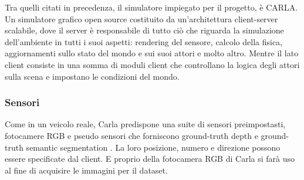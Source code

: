 \documentclass[14pt]{extarticle}
\begin{document}

Tra quelli citati in precedenza, il simulatore  impiegato per il progetto, è CARLA.
Un simulatore grafico open source costituito da un'architettura client-server scalabile, dove il server è responsabile  di tutto ciò che riguarda la simulazione dell'ambiente in tutti i suoi aspetti: rendering del sensore, calcolo della fisica, aggiornamenti sullo stato del mondo e sui suoi attori e molto altro. 
Mentre il lato client consiste in una somma di moduli client che controllano la logica degli attori sulla scena e impostano le condizioni del mondo.
 
\subsubsection{Sensori}
Come in un  veicolo reale, Carla predispone una suite di sensori preimpostasti, fotocamere RGB e pseudo sensori che forniscono ground-truth depth e ground-truth semantic segmentation .
La loro posizione, numero e direzione possono essere specificate dal client.
E proprio della fotocamera RGB di Carla si farà uso al fine di acquisire le immagini per il dataset.
\end{document}
